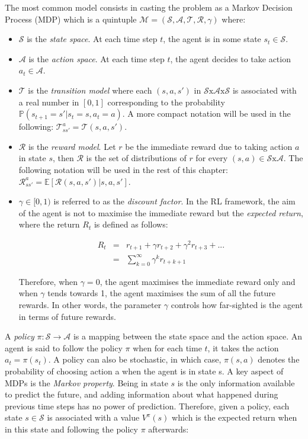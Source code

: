 			The most common model consists in casting the problem as a Markov Decision Process (MDP) which is a quintuple $\mathcal{M} = (\mathcal{S},\mathcal{A},\mathscr{T},\mathscr{R},\gamma)$ where:
			\begin{itemize}
					\item $\mathcal{S}$ is the \textit{state space}. At each time step $t$, the agent is in some state $s_t \in \mathcal{S}$.
					\item $\mathcal{A}$ is the \textit{action space}. At each time step $t$, the agent decides to take action $a_t \in \mathcal{A}$.
					\item $\mathscr{T}$ is the \textit{transition model} where each $(s,a,s')$ in $\mathcal{S} \text{x} \mathcal{A} \text{x} \mathcal{S}$ is associated with a real number in $[0,1]$ corresponding to the probability $\mathbb{P} (s_{t+1} = s'|s_t = s, a_t=a)$. A more compact notation will be used in the following: $\mathscr{T}_{ss'}^a = \mathscr{T} (s,a,s')$.
					\item $\mathscr{R}$ is the \textit{reward model}. Let $r$ be the immediate reward due to taking action $a$ in state $s$, then $\mathscr{R}$ is the set of distributions of $r$ for every $(s,a) \in \mathcal{S} \text{x} \mathcal{A}$. The following notation will be used in the rest of this chapter: $\mathscr{R}_{ss'}^a = \mathbb{E} [\mathscr{R} (s,a,s')|s,a,s']$.
					\item $\gamma \in [0,1)$ is referred to as the \textit{discount factor}. In the RL framework, the aim of the agent is not to maximise the immediate reward but the \textit{expected return}, where the return $R_t$ is defined as follows:
					
					\begin{eqnarray}
						R_t & = & r_{t+1} + \gamma r_{t+2} + \gamma^2 r_{t+3} + ... \nonumber \\
						& = & \sum_{k=0}^\infty \gamma^k r_{t+k+1} \label{eq:return}
					\end{eqnarray}
					
					Therefore, when $\gamma = 0$, the agent maximises the immediate reward only and when $\gamma$ tends towards 1, the agent maximises the sum of all the future rewards. In other words, the parameter $\gamma$ controls how far-sighted is the agent in terms of future rewards.
	\end{itemize}
			
			A \textit{policy} $\pi : \mathcal{S} \rightarrow \mathcal{A}$ is a mapping between the state space and the action space. An agent is said to follow the policy $\pi$ when for each time $t$, it takes the action $a_t = \pi(s_t)$. A policy can also be stochastic, in which case, $\pi (s,a)$ denotes the probability of choosing action a when the agent is in state s. A key aspect of MDPs is the \textit{Markov property}. Being in state $s$ is the only information available to predict the future, and adding information about what happened during previous time steps has no power of prediction. Therefore, given a policy, each state $s \in \mathcal{S}$ is associated with a value $V^\pi (s)$ which is the expected return when in this state and following the policy $\pi$ afterwards:
				
